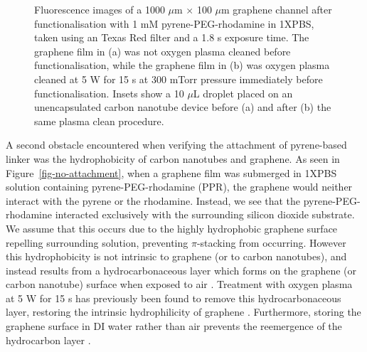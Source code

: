 \documentclass[
  a4paper,
]{scrbook}
\begin{document}
\begin{figure}
\begin{minipage}[t]{0.47\linewidth}
{{}

}

\subcaption{\label{fig-attachment-post-plasma}}
\end{minipage}%

\caption{\label{fig-hydrophobicity}Fluorescence images of a 1000
\(\mu\)m \(\times\) 100 \(\mu\)m graphene channel after
functionalisation with 1 mM pyrene-PEG-rhodamine in 1XPBS, taken using
an Texas Red filter and a 1.8 s exposure time. The graphene film in (a)
was not oxygen plasma cleaned before functionalisation, while the
graphene film in (b) was oxygen plasma cleaned at 5 W for 15 s at 300
mTorr pressure immediately before functionalisation. Insets show a 10
\(\mu\)L droplet placed on an unencapsulated carbon nanotube device
before (a) and after (b) the same plasma clean procedure.}

\end{figure}

A second obstacle encountered when verifying the attachment of
pyrene-based linker was the hydrophobicity of carbon nanotubes and
graphene. As seen in Figure~\ref{fig-no-attachment}, when a graphene
film was submerged in 1XPBS solution containing pyrene-PEG-rhodamine
(PPR), the graphene would neither interact with the pyrene or the
rhodamine. Instead, we see that the pyrene-PEG-rhodamine interacted
exclusively with the surrounding silicon dioxide substrate. We assume
that this occurs due to the highly hydrophobic graphene surface
repelling surrounding solution, preventing \(\pi\)-stacking from
occurring. However this hydrophobicity is not intrinsic to graphene (or
to carbon nanotubes), and instead results from a hydrocarbonaceous layer
which forms on the graphene (or carbon nanotube) surface when exposed to
air \autocite{Ashraf2014,Stando2019}. Treatment with oxygen plasma at 5
W for 15 s has previously been found to remove this hydrocarbonaceous
layer, restoring the intrinsic hydrophilicity of graphene
\autocite{Shin2010}. Furthermore, storing the graphene surface in DI
water rather than air prevents the reemergence of the hydrocarbon layer
\autocite{Ashraf2014}.
\end{document}
